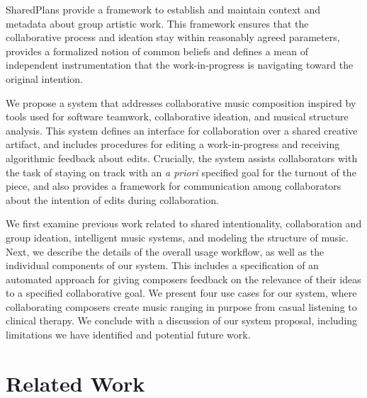 \documentclass[final,authoryear,5p,times,twocolumn]{elsarticle}
\begin{document}
SharedPlans provide a framework to establish and maintain context and metadata about group artistic work. This framework ensures that the collaborative process and ideation stay within reasonably agreed parameters, provides a formalized notion of common beliefs and defines a mean of independent instrumentation that the work-in-progress is navigating toward the original intention.

We propose a system that addresses collaborative music composition inspired by tools used for software teamwork, collaborative ideation, and musical structure analysis. This system defines an interface for collaboration over a shared creative artifact, and includes procedures for editing a work-in-progress and receiving algorithmic  feedback about edits. Crucially, the system assists collaborators with the task of staying on track with an \textit{a priori} specified goal for the turnout of the piece, and also provides a framework for communication among collaborators about the intention of edits during collaboration.

We first examine previous work related to shared intentionality, collaboration and group ideation, intelligent music systems, and modeling the structure of music. Next, we describe the details of the overall usage workflow, as well as the individual components of our system. This includes a specification of an automated approach for giving composers feedback on the relevance of their ideas to a specified collaborative goal. We present four use cases for our system, where collaborating composers create music ranging in purpose from casual listening to clinical therapy. We conclude with a discussion of our system proposal, including limitations we have identified and potential future work.

\section{Related Work}

\end{document}
